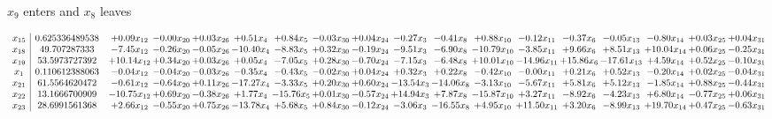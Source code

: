 \documentclass[9pt]{article}
\begin{document}
 $ x_{9} $ enters and $ x_{8} $ leaves 

 \[\begin{array}{c| c c@{\hskip 2pt} c@{\hskip 2pt} c@{\hskip 2pt} c@{\hskip 2pt} c@{\hskip 2pt} c@{\hskip 2pt} c@{\hskip 2pt} c@{\hskip 2pt} c@{\hskip 2pt} c@{\hskip 2pt} c@{\hskip 2pt} c@{\hskip 2pt} c@{\hskip 2pt} c@{\hskip 2pt} c@{\hskip 2pt} c@{\hskip 2pt} }
 x_{15}   &  0.625336489538 & +  0.09 x_{12} & -0.00 x_{20} & +  0.03 x_{26} & +  0.51 x_{4} & +  0.84 x_{5} & -0.03 x_{30} & +  0.04 x_{24} & -0.27 x_{3} & -0.41 x_{8} & +  0.88 x_{10} & -0.12 x_{11} & -0.37 x_{6} & -0.05 x_{13} & -0.80 x_{14} & +  0.03 x_{25} & +  0.04 x_{31}\\
 x_{18}   &  49.707287333 & -7.45 x_{12} & -0.26 x_{20} & -0.05 x_{26} & -10.40 x_{4} & -8.83 x_{5} & +  0.32 x_{30} & -0.19 x_{24} & -9.51 x_{3} & -6.90 x_{8} & -10.79 x_{10} & -3.85 x_{11} & +  9.66 x_{6} & +  8.51 x_{13} & + 10.04 x_{14} & +  0.06 x_{25} & -0.25 x_{31}\\
 x_{19}   &  53.5973727392 & + 10.14 x_{12} & +  0.34 x_{20} & +  0.03 x_{26} & +  0.05 x_{4} & -7.05 x_{5} & +  0.28 x_{30} & -0.70 x_{24} & -7.15 x_{3} & -6.48 x_{8} & + 10.01 x_{10} & -14.96 x_{11} & + 15.86 x_{6} & -17.61 x_{13} & +  4.59 x_{14} & +  0.52 x_{25} & -0.10 x_{31}\\
 x_{1}   &  0.110612388063 & -0.04 x_{12} & -0.04 x_{20} & -0.03 x_{26} & -0.35 x_{4} & -0.43 x_{5} & -0.02 x_{30} & +  0.04 x_{24} & +  0.32 x_{3} & +  0.22 x_{8} & -0.42 x_{10} & -0.00 x_{11} & +  0.21 x_{6} & +  0.52 x_{13} & -0.20 x_{14} & +  0.02 x_{25} & -0.04 x_{31}\\
 x_{21}   &  61.5564620472 & -0.61 x_{12} & -0.64 x_{20} & +  0.11 x_{26} & -17.27 x_{4} & -3.33 x_{5} & +  0.20 x_{30} & +  0.60 x_{24} & -13.54 x_{3} & -14.06 x_{8} & -3.13 x_{10} & -5.67 x_{11} & +  5.81 x_{6} & +  5.12 x_{13} & -1.85 x_{14} & +  0.88 x_{25} & -0.44 x_{31}\\
 x_{22}   &  13.1666700909 & -10.75 x_{12} & +  0.69 x_{20} & -0.38 x_{26} & +  1.77 x_{4} & -15.76 x_{5} & +  0.01 x_{30} & -0.57 x_{24} & + 14.94 x_{3} & +  7.87 x_{8} & -15.87 x_{10} & +  3.27 x_{11} & -8.92 x_{6} & -4.23 x_{13} & +  6.80 x_{14} & -0.77 x_{25} & +  0.06 x_{31}\\
 x_{23}   &  28.6991561368 & +  2.66 x_{12} & -0.55 x_{20} & +  0.75 x_{26} & -13.78 x_{4} & +  5.68 x_{5} & +  0.84 x_{30} & -0.12 x_{24} & -3.06 x_{3} & -16.55 x_{8} & +  4.95 x_{10} & + 11.50 x_{11} & +  3.20 x_{6} & -8.99 x_{13} & + 19.70 x_{14} & +  0.47 x_{25} & -0.63 x_{31}\\

\end{array}\]
\end{document}
